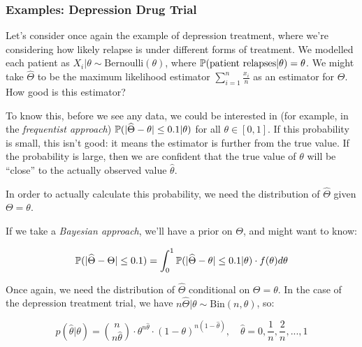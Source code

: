 \documentclass[a4paper]{article}
\begin{document}
            \subsubsection{Examples: Depression Drug Trial}

            Let's consider once again the example of depression treatment, where
            we're considering how likely relapse is under different forms of
            treatment. We modelled each patient as $X_i|\theta \sim
            \text{Bernoulli}(\theta)$, where $\mathbb{P}(\text{patient relapses} |
            \theta) = \theta$. We might take $\widehat \Theta$ to be the maximum
            likelihood estimator $\sum\limits_{i=1}^n \frac{x_i}{n}$ as an
            estimator for $\Theta$. How good is this estimator?

            To know this, before we see any data, we could be interested in (for
            example, in the \textit{frequentist approach}) $\mathbb{P}(|\widehat
            \Theta - \theta| \leq 0.1 | \theta)$ for all $\theta \in [0, 1]$. If
            this probability is small, this isn't good: it means the estimator
            is further from the true value. If the probability is large, then we
            are confident that the true value of $\theta$ will be ``close'' to
            the actually observed value $\widehat \theta$.

            In order to actually calculate this probability, we need the
            distribution of $\widehat \Theta$ given $\Theta = \theta$.

            If we take a \textit{Bayesian approach}, we'll have a prior on
            $\Theta$, and might want to know:

            \[
                \mathbb{P}(|\widehat \Theta - \Theta| \leq 0.1) = \int_0^1 \mathbb{P}(|
                \widehat \Theta - \theta| \leq 0.1 | \theta) \cdot f(\theta)
                d\theta
            \]

            Once again, we need the distribution of $\widehat \Theta$
            conditional on $\Theta = \theta$. In the case of the depression
            treatment trial, we have $n\widehat \Theta | \theta \sim
            \text{Bin}(n, \theta)$, so:

            \[
                p(\widehat \theta | \theta) = {n \choose {n\widehat \theta}}
                \cdot \theta^{n\widehat \theta} \cdot (1 - \theta)^{n(1 -
                \widehat \theta)}, \quad \widehat \theta = 0, \frac{1}{n},
                \frac{2}{n}, ..., 1
            \]
\end{document}
